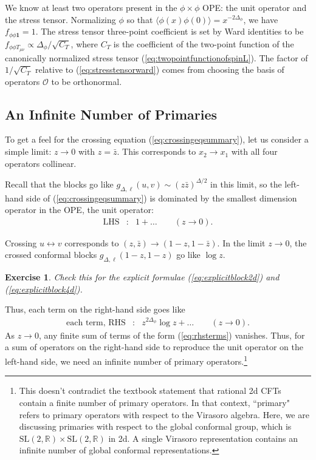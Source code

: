 \documentclass{ws-rv9x6}
\newcommand\be{\begin{eqnarray}}
\newcommand\ee{\end{eqnarray}}
\newcommand\f\phi
\newcommand\cO{\mathcal{O}}
\newcommand\<\langle
\renewcommand\>\rangle
\newcommand\R{\mathbb{R}}
\renewcommand\.{\cdot}
\newcommand\x\times
\newcommand\De{\Delta}
\newtheorem{exercise}{Exercise}[section]
\begin{document}
We know at least two operators present in the $\f\x\f$ OPE: the unit operator and the stress tensor.  Normalizing $\f$ so that $\<\f(x)\f(0)\>=x^{-2\De_\f}$, we have $f_{\f\f\mathbf{1}}=1$.  The stress tensor three-point coefficient is set by Ward identities to be $f_{\f\f T_{\mu\nu}}\propto \De_\f/\sqrt{C_T}$, where $C_T$ is the coefficient of the two-point function of the canonically normalized stress tensor (\ref{eq:twopointfunctionofspinL}).  The factor of $1/\sqrt{C_T}$ relative to (\ref{eq:stresstensorward}) comes from choosing the basis of operators $\cO$ to be orthonormal.


\subsection{An Infinite Number of Primaries}

To get a feel for the crossing equation (\ref{eq:crossingeqsummary}), let us consider a simple limit: $z\to 0$ with $z=\bar z$. This corresponds to $x_2\to x_1$ with all four operators collinear.

Recall that the blocks go like $g_{\De,\ell}(u,v)\sim (z\bar z)^{\De/2}$ in this limit, so the left-hand side of (\ref{eq:crossingeqsummary}) is dominated by the smallest dimension operator in the OPE, the unit operator:
\be
\mathrm{LHS} &:& 1+\dots \qquad(z\to 0).
\ee

Crossing $u\leftrightarrow v$ corresponds to $(z,\bar z)\to (1-z,1-\bar z)$.  In the limit $z\to 0$, the crossed conformal blocks $g_{\De,\ell}(1-z,1-z)$ go like $\log z$.
\begin{exercise}
Check this for the explicit formulae (\ref{eq:explicitblock2d}) and (\ref{eq:explicitblock4d}).
\end{exercise}
Thus, each term on the right-hand side goes like
\be
\label{eq:rhsterms}
\textrm{each term, RHS} &:& z^{2\De_\f}\log z + \dots \qquad(z\to 0).
\ee
As $z\to 0$, any finite sum of terms of the form (\ref{eq:rhsterms}) vanishes.  Thus, for a sum of operators on the right-hand side to reproduce the unit operator on the left-hand side, we need an infinite number of primary operators.\footnote{This doesn't contradict the textbook statement that rational 2d CFTs contain a finite number of primary operators.  In that context, ``primary" refers to primary operators with respect to the Virasoro algebra.  Here, we are discussing primaries with respect to the global conformal group, which is $\mathrm{SL}(2,\R)\x\mathrm{SL}(2,\R)$ in 2d.  A single Virasoro representation contains an infinite number of global conformal representations.}
\end{document}
